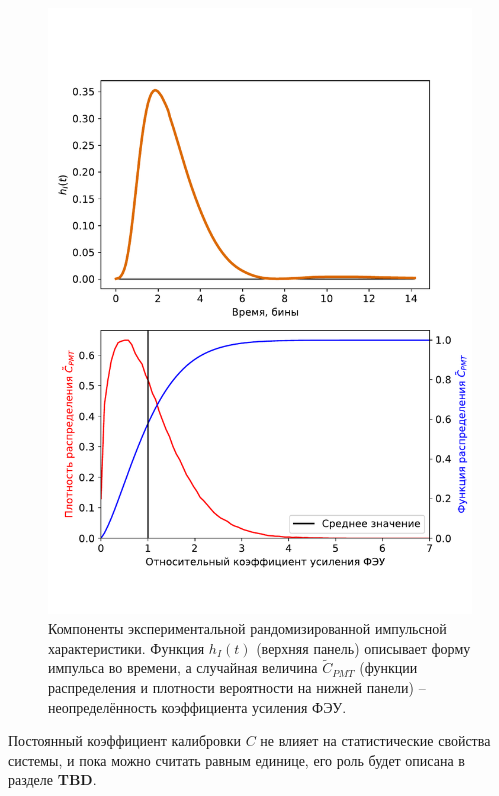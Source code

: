 \documentclass[12pt]{book}
\begin{document}
	\begin{figure}
		\centering
		\includegraphics[width=\columnwidth]{experimental-ir-params}
		\caption{Компоненты экспериментальной рандомизированной импульсной характеристики. Функция $h_I(t)$ (верхняя панель) описывает форму импульса во времени, а случайная величина $\tilde{C}_{PMT}$ (функции распределения и плотности вероятности на нижней панели) -- неопределённость коэффициента усиления ФЭУ.}
		\label{pic:experimental-rir-params}
	\end{figure}

	Постоянный коэффициент калибровки $C$ не влияет на статистические свойства системы, и пока можно считать равным единице, его роль будет описана в разделе \textbf{TBD}.
\end{document}
